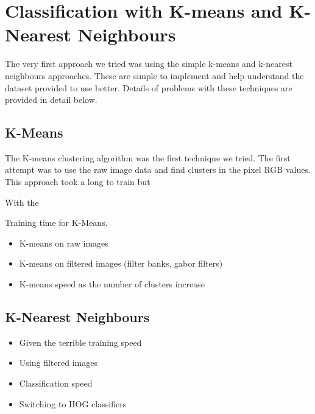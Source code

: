 \documentclass{article} %
\begin{document}
\section{Classification with K-means and K-Nearest Neighbours}
    The very first approach we tried was using the simple k-means and k-nearest neighbours approaches. These are simple to implement and help understand the dataset provided to use better. Details of problems with these techniques are provided in detail below.\\
    \subsection{K-Means} %
        The K-means clustering algorithm was the first technique we tried. The first attempt was to use the raw image data and find clusters in the pixel RGB values. This approach took a long to train but 

        With the 

        Training time for K-Means.\\



        \begin{itemize}
            \item K-means on raw images
            \item K-means on filtered images (filter banks, gabor filters)
            \item K-means speed as the number of clusters increase
        \end{itemize}

    \subsection{K-Nearest Neighbours} %
    \label{sub:K-Nearest Neighbours}
        \begin{itemize}
            \item Given the terrible training speed
            \item Using filtered images
            \item Classification speed
            \item Switching to HOG classifiers
        \end{itemize}

\end{document}
